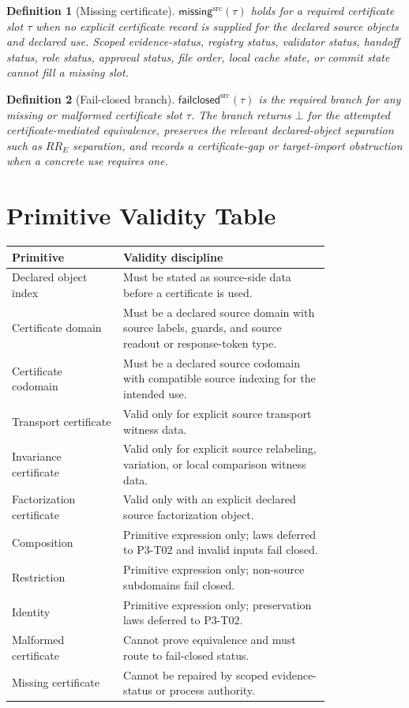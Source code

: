 \documentclass[11pt]{article}
\newcommand{\CMissing}{\mathsf{missing}^{\mathrm{src}}}
\newcommand{\Fail}{\mathsf{failclosed}^{\mathrm{src}}}
\newcommand{\Bottom}{\bot}
\newtheorem{definition}{Definition}
\begin{document}
\begin{definition}[Missing certificate]
\(\CMissing(\tau)\) holds for a required certificate slot \(\tau\) when no
explicit certificate record is supplied for the declared source objects and
declared use. Scoped evidence-status, registry status, validator status,
handoff status, role status, approval status, file order, local cache state,
or commit state cannot fill a missing slot.
\end{definition}

\begin{definition}[Fail-closed branch]
\(\Fail(\tau)\) is the required branch for any missing or malformed
certificate slot \(\tau\). The branch returns \(\Bottom\) for the attempted
certificate-mediated equivalence, preserves the relevant declared-object
separation such as \(RR_E\) separation, and records a certificate-gap or
target-import obstruction when a concrete use requires one.
\end{definition}

\section{Primitive Validity Table}

\begin{longtable}{p{0.28\linewidth}p{0.52\linewidth}}
\toprule
Primitive & Validity discipline \\
\midrule
Declared object index & Must be stated as source-side data before a
certificate is used. \\
Certificate domain & Must be a declared source domain with source labels,
guards, and source readout or response-token type. \\
Certificate codomain & Must be a declared source codomain with compatible
source indexing for the intended use. \\
Transport certificate & Valid only for explicit source transport witness
data. \\
Invariance certificate & Valid only for explicit source relabeling,
variation, or local comparison witness data. \\
Factorization certificate & Valid only with an explicit declared source
factorization object. \\
Composition & Primitive expression only; laws deferred to P3-T02 and invalid
inputs fail closed. \\
Restriction & Primitive expression only; non-source subdomains fail closed. \\
Identity & Primitive expression only; preservation laws deferred to P3-T02. \\
Malformed certificate & Cannot prove equivalence and must route to
fail-closed status. \\
Missing certificate & Cannot be repaired by scoped evidence-status or
process authority. \\
\bottomrule
\end{longtable}
\end{document}
